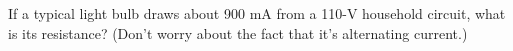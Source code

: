 If a typical light bulb draws about 900 mA from a 110-V
        household circuit, what is its resistance?  (Don't worry
        about the fact that it's alternating current.)
        \answercheck

